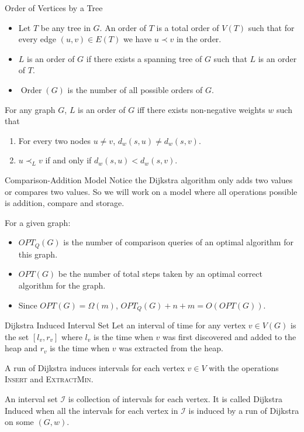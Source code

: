 \documentclass[10pt]{beamer}
\DeclareMathOperator{\order}{Order}
\begin{document}
\begin{frame}{Order of Vertices by a Tree}
	\begin{itemize}
		\item Let $T$ be any tree in $G$. An order of $T$ is a total order of $V(T)$ such that for every edge $(u,v)\in E(T)$ we have $u\prec v$ in the order.\pause 
		\item $L$ is an order of $G$ if there exists a spanning tree of $G$ such that $L$ is an order of $T$.\pause 
		\item $\order(G)$ is the number of all possible orders of $G$.
	\end{itemize}\pause \vfill

	\begin{theorem}
		For any graph $G$, $L$ is an order of $G$ iff there exists non-negative weights $w$ such that \begin{enumerate}
			\item For every two nodes $u\neq v$, $d_w(s,u)\neq d_w(s,v)$.
			\item $u\prec_L v$ if and only if $d_w(s,u)<d_w(s, v)$.
		\end{enumerate}
	\end{theorem}
\end{frame}
\begin{frame}{Comparison-Addition Model}
  Notice the Dijkstra algorithm only adds two values or compares two values. So we will work on a model where all operations possible is addition, compare and storage. \pause 

  For a given graph:
  \begin{itemize}
      \item $OPT_Q(G)$ is the number of comparison queries of an optimal algorithm for this graph. 
      \item $OPT(G)$ be the number of total steps taken by an optimal correct algorithm for the graph. \pause 
      \item Since $OPT(G)=\Omega(m)$, $OPT_Q(G)+n+m=O(OPT(G))$. 
  \end{itemize}
    
\end{frame}
\begin{frame}{Dijkstra Induced Interval Set}
	Let an interval of time for any vertex $v\in V(G)$ is the set $[l_v,r_v]$ where $l_v$ is the time when $v$ was first discovered and added to the heap and $r_v$ is the time when $v$ was extracted from the heap. \pause \setlength{\parindent}{1cm}\vfill

	A run of Dijkstra induces intervals for each vertex $v\in V$ with the operations \textsc{Insert} and \textsc{ExtractMin}.\pause  \vfill

	An interval set $\mathcal{I}$ is collection of intervals for each vertex. It is called Dijkstra Induced when all the intervals for each vertex in $\mathcal{I}$ is induced by a run of Dijkstra on some $(G,w)$.
\end{frame}
\end{document}
